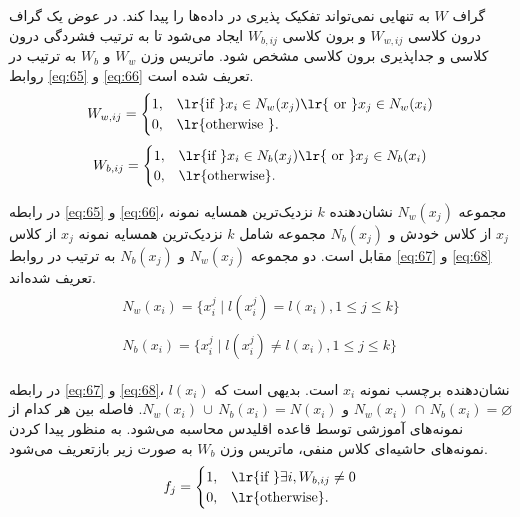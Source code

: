 گراف $W$ به تنهایی نمی‌تواند تفکیک پذیری در داده‌ها را پیدا کند. در عوض یک گراف درون کلاسی  $W_{w,ij}$ و برون کلاسی   $W_{b,ij}$ ایجاد می‌شود تا به ترتیب فشردگی درون کلاسی  و جداپذیری برون کلاسی  مشخص شود. ماتریس وزن $W_{w}$ و  $W_{b}$ به ترتیب در روابط \ref{eq:65} و \ref{eq:66} تعریف شده است.
\begin{equation}\label{eq:65}
W_{w,ij} =
\begin{cases}
1, & \textrm{\lr{if }} x_i \in N_w(x_j) \textrm{\lr{ or }} x_j \in N_w(x_i)  \\
0, & \textrm{\lr{otherwise }}.
\end{cases}
\end{equation}
\begin{equation}\label{eq:66}
W_{b,ij} =
\begin{cases}
1, & \textrm{\lr{if }} x_i \in N_b(x_j) \textrm{\lr{ or }} x_j \in N_b(x_i)  \\
0, & \textrm{\lr{otherwise}}.
\end{cases}
\end{equation}

در رابطه \ref{eq:65} و \ref{eq:66}، مجموعه $N_w(x_j)$ نشان‌دهنده $k$ نزدیک‌ترین همسایه نمونه $x_j$ از کلاس خودش و $N_b(x_j)$ مجموعه   شامل $k$ نزدیک‌ترین همسایه نمونه  $x_j$ از کلاس مقابل است. دو مجموعه $N_w(x_j)$ و $N_b(x_j)$ به ترتیب در روابط \ref{eq:67} و \ref{eq:68} تعریف شده‌اند.
\begin{align}
\label{eq:67}
\begin{split}
N_w\left(x_i\right) = \{x^j_i \mid l(x^j_i) = l(x_i), 1 \leq j \leq k \}
\end{split} \\
\label{eq:68}
\begin{split}
N_b\left(x_i\right) = \{x^j_i \mid l(x^j_i) \neq l(x_i), 1 \leq j \leq k \}
\end{split}
\end{align}

در رابطه \ref{eq:67} و \ref{eq:68}،  $l(x_i)$ نشان‌دهنده برچسب نمونه $x_i$ است. بدیهی است که  $N_w(x_i)\, \cap \, N_b(x_i) = \varnothing $ و  $N_w(x_i)\, \cup \, N_b(x_i) = N(x_i)$. فاصله بین هر کدام از نمونه‌های آموزشی توسط قاعده اقلیدس محاسبه می‌شود. به منظور پیدا کردن نمونه‌های حاشیه‌ای کلاس منفی، ماتریس وزن  $W_{b}$ به صورت زیر بازتعریف می‌شود.
\begin{equation}\label{eq:69}
f_{j} =
\begin{cases}
1, & \textrm{\lr{if }} \exists i, W_{b,ij} \neq 0  \\
0, & \textrm{\lr{otherwise}}.
\end{cases}
\end{equation}   

